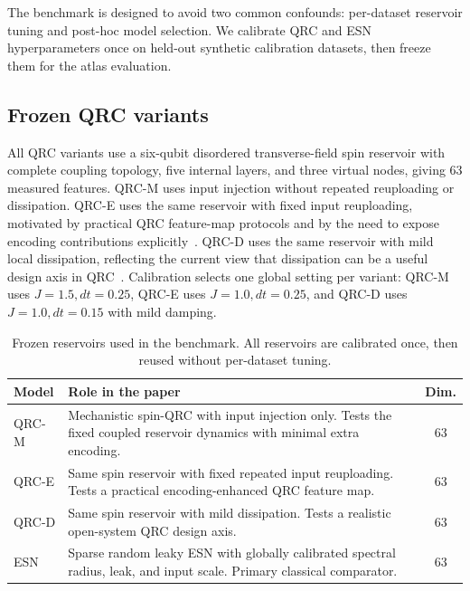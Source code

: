 The benchmark is designed to avoid two common confounds: per-dataset reservoir tuning and post-hoc model selection. We calibrate QRC and ESN hyperparameters once on held-out synthetic calibration datasets, then freeze them for the atlas evaluation.

\subsection{Frozen QRC variants}

All QRC variants use a six-qubit disordered transverse-field spin reservoir with complete coupling topology, five internal layers, and three virtual nodes, giving 63 measured features. QRC-M uses input injection without repeated reuploading or dissipation. QRC-E uses the same reservoir with fixed input reuploading, motivated by practical QRC feature-map protocols and by the need to expose encoding contributions explicitly~\cite{govia2022nonlinear}. QRC-D uses the same reservoir with mild local dissipation, reflecting the current view that dissipation can be a useful design axis in QRC~\cite{sannia2024dissipation}. Calibration selects one global setting per variant: QRC-M uses \(J=1.5, dt=0.25\), QRC-E uses \(J=1.0, dt=0.25\), and QRC-D uses \(J=1.0, dt=0.15\) with mild damping.

\begin{table}[!t]
\centering
\caption{Frozen reservoirs used in the benchmark. All reservoirs are calibrated once, then reused without per-dataset tuning.}
\label{tab:reservoir-protocols}
\scriptsize
\setlength{\tabcolsep}{3.0pt}
\renewcommand{\arraystretch}{1.05}
\begin{tabularx}{\columnwidth}{@{}lXc@{}}
\toprule
Model & Role in the paper & Dim. \\
\midrule
QRC-M & Mechanistic spin-QRC with input injection only. Tests the fixed coupled reservoir dynamics with minimal extra encoding. & 63 \\
QRC-E & Same spin reservoir with fixed repeated input reuploading. Tests a practical encoding-enhanced QRC feature map. & 63 \\
QRC-D & Same spin reservoir with mild dissipation. Tests a realistic open-system QRC design axis. & 63 \\
ESN & Sparse random leaky ESN with globally calibrated spectral radius, leak, and input scale. Primary classical comparator. & 63 \\
\bottomrule
\end{tabularx}
\end{table}

